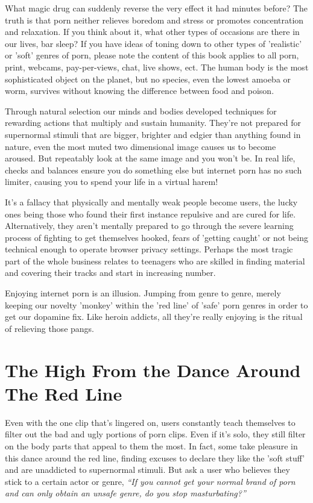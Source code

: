 \documentclass[
]{book}
\begin{document}
What magic drug can suddenly reverse the very effect it had minutes before? The truth is that porn neither relieves boredom and stress or promotes concentration and relaxation. If you think about it, what other types of occasions are there in our lives, bar sleep? If you have ideas of toning down to other types of 'realistic' or 'soft' genres of porn, please note the content of this book applies to all porn, print, webcams, pay-per-views, chat, live shows, ect. The human body is the most sophisticated object on the planet, but no species, even the lowest amoeba or worm, survives without knowing the difference between food and poison.

Through natural selection our minds and bodies developed techniques for rewarding actions that multiply and sustain humanity. They're not prepared for supernormal stimuli that are bigger, brighter and edgier than anything found in nature, even the most muted two dimensional image causes us to become aroused. But repeatably look at the same image and you won't be. In real life, checks and balances ensure you do something else but internet porn has no such limiter, causing you to spend your life in a virtual harem!

It's a fallacy that physically and mentally weak people become users, the lucky ones being those who found their first instance repulsive and are cured for life. Alternatively, they aren't mentally prepared to go through the severe learning process of fighting to get themselves hooked, fears of 'getting caught' or not being technical enough to operate browser privacy settings. Perhaps the most tragic part of the whole business relates to teenagers who are skilled in finding material and covering their tracks and start in increasing number.

Enjoying internet porn is an illusion. Jumping from genre to genre, merely keeping our novelty 'monkey' within the 'red line' of 'safe' porn genres in order to get our dopamine fix. Like heroin addicts, all they're really enjoying is the ritual of relieving those pangs.

\hypertarget{the-high-from-the-dance-around-the-red-line}{%
\section{The High From the Dance Around The Red Line}\label{the-high-from-the-dance-around-the-red-line}}

Even with the one clip that's lingered on, users constantly teach themselves to filter out the bad and ugly portions of porn clips. Even if it's solo, they still filter on the body parts that appeal to them the most. In fact, some take pleasure in this dance around the red line, finding excuses to declare they like the 'soft stuff' and are unaddicted to supernormal stimuli. But ask a user who believes they stick to a certain actor or genre, \emph{``If you cannot get your normal brand of porn and can only obtain an unsafe genre, do you stop masturbating?''}
\end{document}
